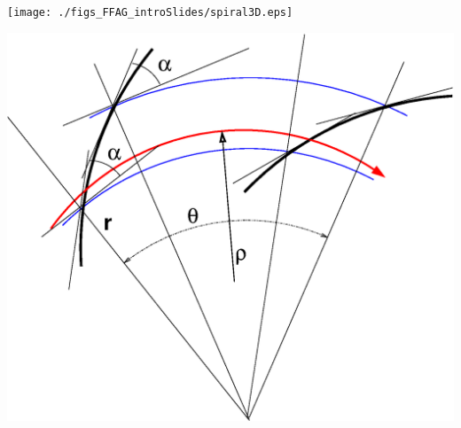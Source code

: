 \documentclass[12pt]{article}
\begin{document}
\begin{minipage}[b]{1.\linewidth}
\begin{minipage}[b]{.7\linewidth}
~

~


\end{minipage}\hspace{5mm}
\begin{minipage}[b]{.3\linewidth}

\texttt{[image: ./figs\_FFAG\_introSlides/spiral3D.eps]}


\vspace{-0mm}
 \hspace{10mm}\includegraphics*[bbllx=14,bblly=120,bburx=520,bbury=500,width=.99\linewidth]{./figs_FFAG_introSlides/spiralFoc.eps}

~

~

\end{minipage}
\end{minipage}





\clearpage 
\end{document}
